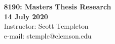 
\let\counterwithout\relax
\let\counterwithin\relax
{}



\noindent \textbf{8190: Masters Thesis Research}\\
\noindent \textbf{14 July 2020}\\
\noindent Instructor: Scott Templeton \\
e-mail: stemple@clemson.edu\\
\begin{landscape}

\end{landscape}






